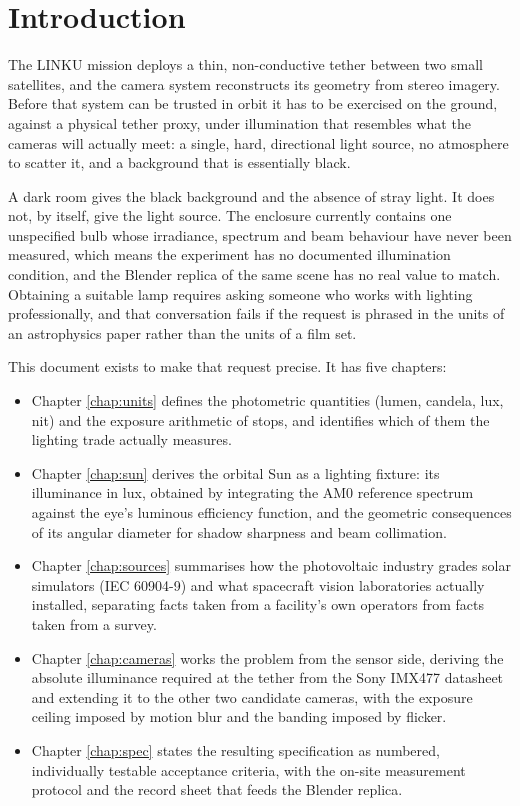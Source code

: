 \chapter*{Introduction}

The LINKU mission deploys a thin, non-conductive tether between two small satellites, and the camera system reconstructs its geometry from stereo imagery. Before that system can be trusted in orbit it has to be exercised on the ground, against a physical tether proxy, under illumination that resembles what the cameras will actually meet: a single, hard, directional light source, no atmosphere to scatter it, and a background that is essentially black.

A dark room gives the black background and the absence of stray light. It does not, by itself, give the light source. The enclosure currently contains one unspecified bulb whose irradiance, spectrum and beam behaviour have never been measured, which means the experiment has no documented illumination condition, and the Blender replica of the same scene has no real value to match. Obtaining a suitable lamp requires asking someone who works with lighting professionally, and that conversation fails if the request is phrased in the units of an astrophysics paper rather than the units of a film set.

This document exists to make that request precise. It has five chapters:

\begin{itemize}
    \item Chapter \ref{chap:units} defines the photometric quantities (lumen, candela, lux, nit) and the exposure arithmetic of stops, and identifies which of them the lighting trade actually measures.
    \item Chapter \ref{chap:sun} derives the orbital Sun as a lighting fixture: its illuminance in lux, obtained by integrating the AM0 reference spectrum against the eye's luminous efficiency function, and the geometric consequences of its angular diameter for shadow sharpness and beam collimation.
    \item Chapter \ref{chap:sources} summarises how the photovoltaic industry grades solar simulators (IEC 60904-9) and what spacecraft vision laboratories actually installed, separating facts taken from a facility's own operators from facts taken from a survey.
    \item Chapter \ref{chap:cameras} works the problem from the sensor side, deriving the absolute illuminance required at the tether from the Sony IMX477 datasheet and extending it to the other two candidate cameras, with the exposure ceiling imposed by motion blur and the banding imposed by flicker.
    \item Chapter \ref{chap:spec} states the resulting specification as numbered, individually testable acceptance criteria, with the on-site measurement protocol and the record sheet that feeds the Blender replica.
\end{itemize}

